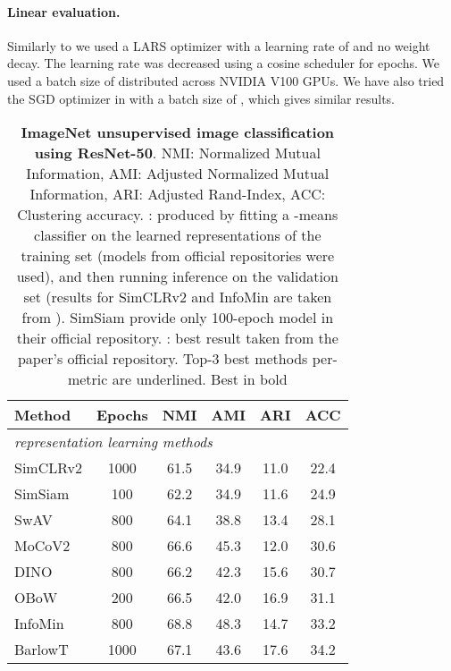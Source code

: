 \documentclass[runningheads]{llncs}
\begin{document}
\paragraph{Linear evaluation.} Similarly to \cite{chen2021exploring} we used a LARS optimizer \cite{you2017large} with a learning rate of  and no weight decay. The learning rate was decreased using a cosine scheduler for  epochs. We used a batch size of  distributed across  NVIDIA V100 GPUs. We have also tried the SGD optimizer in \cite{he2020momentum} with a batch size of , which gives similar results.

\begin{table}[bt]
  \centering
  \setlength\tabcolsep{4pt}
    \caption{\textbf{ImageNet unsupervised image classification using ResNet-50}. NMI: Normalized Mutual Information, AMI: Adjusted Normalized Mutual Information, ARI: Adjusted Rand-Index, ACC: Clustering accuracy. : produced by fitting a -means classifier on the learned representations of the training set (models from official repositories were used), and then running inference on the validation set (results for SimCLRv2 and InfoMin are taken from \cite{zheltonozhskii2020self}). SimSiam provide only 100-epoch model in their official repository. : best result taken from the paper’s official repository. Top-3 best methods per-metric are underlined. Best in bold}
  \label{table:unsupervised_image_classification}
  \begin{tabular}{lccccc}
    \toprule
    Method & Epochs & NMI & AMI & ARI & ACC \\
    \midrule
    \multicolumn{6}{l}{\textit{representation learning methods}}\\
    SimCLRv2 \cite{chen2020big} & 1000 & 61.5 & 34.9 & 11.0 & 22.4 \\
    SimSiam \cite{chen2021exploring} & 100 & 62.2 & 34.9 & 11.6 & 24.9 \\
    SwAV \cite{caron2020unsupervised} & 800 & 64.1 & 38.8 & 13.4 & 28.1 \\
    MoCoV2 \cite{chen2020improved} & 800 & 66.6 & 45.3 & 12.0 & 30.6 \\
    DINO \cite{caron2021emerging} & 800 & 66.2 & 42.3 & 15.6 & 30.7 \\
    OBoW \cite{gidaris2021obow} & 200 & 66.5 & 42.0 & 16.9 & 31.1 \\
    InfoMin \cite{tian2020makes} & 800 & 68.8 & 48.3 & 14.7 & 33.2  \\
    BarlowT \cite{DBLP:conf/icml/ZbontarJMLD21} & 1000 & 67.1 & 43.6 & 17.6 & 34.2 \\

\end{tabular}
\end{table}
\end{document}
